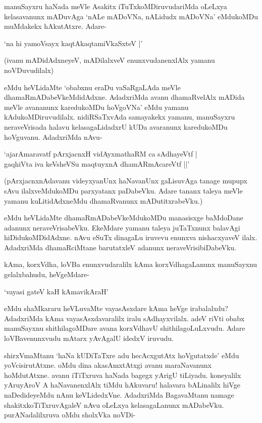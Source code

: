 manuSayxru haNada meVle Asakitx iTuTxkoMDiruvudariMda oLeLxya kelasavanunx mADuvAga `nALe mADoVNa, nALidudx mADoVNa' eMdukoMDu muMdakekx hAkutAtxre. Adare-

\begin{shloka}
`na hi yamoV\s sayx kaqtAkaqtamiVkaSxteV |'
\end{shloka}

(ivanu mADidAdxneyeV, mADilalxveV enunxvudanenxlAlx yamanu noVDuvudilalx)

eMdu heVLidaMte `obabxnu eraDu vaSaRgaLAda meVle dhamaRmADabeVkeMdidAdxne. AdadxriMda avanu dhamaRvelAlx mADida meVle avananunx karedukoMDu hoVgoVNa' eMdu yamanu kAdukoMDiruvudilalx. nidiRSaTxvAda samayakekx yamanu, manuSayxru neraveVrisada halavu kelasagaLidadxrU kUDa avaranunx karedukoMDu hoVguvanu. AdadxriMda nAvu-

\begin{shloka}
`ajarAmaravatf pArxjacnxH vidAyxmathaRM ca sAdhayeVtf |\\
gaqhiVta iva keVsheVSu maqtuyxnA dhamARmAcareVtf ||'
\end{shloka}

(pArxjacnxnAdavanu videyxyanUnx haNavanUnx gaLisuvAga tanage mupupx sAvu ilalxveMdukoMDu parxyatanx paDabeVku. Adare tananx taleya meVle yamanu kuLitidAdxneMdu dhamaRvanunx mADutitxrabeVku.)

eMdu heVLidaMte dhamaRmADabeVkeMdukoMDu manasisxge baMdoDane adanunx neraveVrisabeVku. EkeMdare yamanu taleya juTaTxnunx balavAgi hiDidukoMDidAdxne. nAvu eSuTx dinagaLu iruvevu enunxva nishacxyaveV ilalx. AdadxriMda dhamaRciMtane barutatxleV adanunx neraveVrisibiDabeVku.

kAma, korxVdha, loVBa enunxvudaralilx kAma korxVdhagaLanunx manuSayxnu gelalxbahudu, heVgeMdare-

\begin{shloka}
`vayasi gateV kaH kAmavikAraH'
\end{shloka}

\noindent eMdu shaMkararu heVLuvaMte vayasAsxdare kAma heVge irabalalxdu? AdadxriMda kAma vayasAsxdavaralilx iralu sAdhayxvilalx. adeV riVti obabx manuSayxnu shithilagoMDare avana korxVdhavU shithilagoLuLxvudu. Adare loVBavenunxvudu mAtarx yAvAgalU idedxV iruvudu.

shirxVmaMtanu `haNa kUDiTaTxre adu hecAcxgutAtx hoVgutatxde' eMdu yoVcisirutAtxne. oMdu dina akasAmxtAtxgi avanu maraNavanunx hoMdutAtxne. avanu iTiTxruva haNada bagegx yArigU tiLiyadu. koneyalilx yAruyAroV A haNavanenxlAlx tiMdu hAkuvaru! halavara bALinalilx hiVge naDedideyeMdu nAnu keVLidedxVne. AdadxriMda BagavaMtanu namage shakitxkoTiTxruvAgaleV nAvu oLeLxya kelasagaLanunx mADabeVku. purANadalilxruva oMdu sholxVka noVDi-

